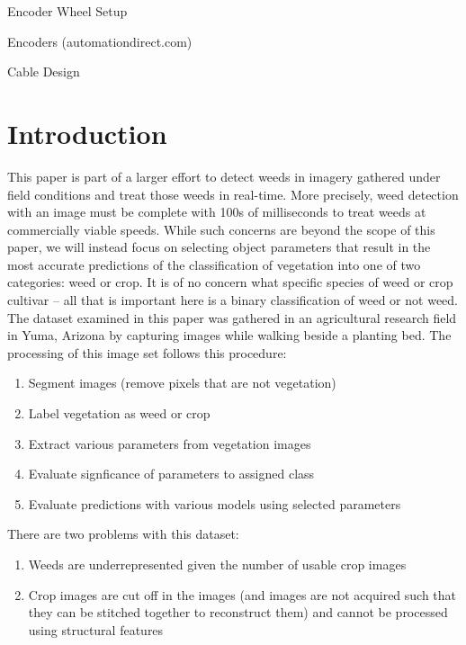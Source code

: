 \documentclass[letterpaper]{article}
\begin{document}
Encoder Wheel Setup

Encoders (automationdirect.com)

Cable Design







%
%

%
%
\section{Introduction}
This paper is part of a larger effort to detect weeds in imagery gathered under field conditions and treat those weeds in real-time. More precisely, weed detection with an image must be complete with 100s of milliseconds to treat weeds at commercially viable speeds. While such concerns are beyond the scope of this paper, we will instead focus on selecting object parameters that result in the most accurate predictions of the classification of vegetation into one of two categories: weed or crop. It is of no concern what specific species of weed or crop cultivar -- all that is important here is a binary classification of weed or not weed.\\
The dataset examined in this paper was gathered in an agricultural research field in Yuma, Arizona by capturing images while walking beside a planting bed. The processing of this image set follows this procedure:
\begin{enumerate}
	\item{Segment images (remove pixels that are not vegetation)}
	\item{Label vegetation as weed or crop}
	\item{Extract various parameters from  vegetation images}
	\item{Evaluate signficance of parameters to assigned class}
	\item{Evaluate predictions with various models using selected parameters}
\end{enumerate}

There are two problems with this dataset:
\begin{enumerate}
	\item{Weeds are underrepresented given the number of usable crop images}
	\item{Crop images are cut off in the images (and images are not acquired such that they can be stitched together to reconstruct them) and cannot be processed using structural features}
\end{enumerate}
\end{document}
